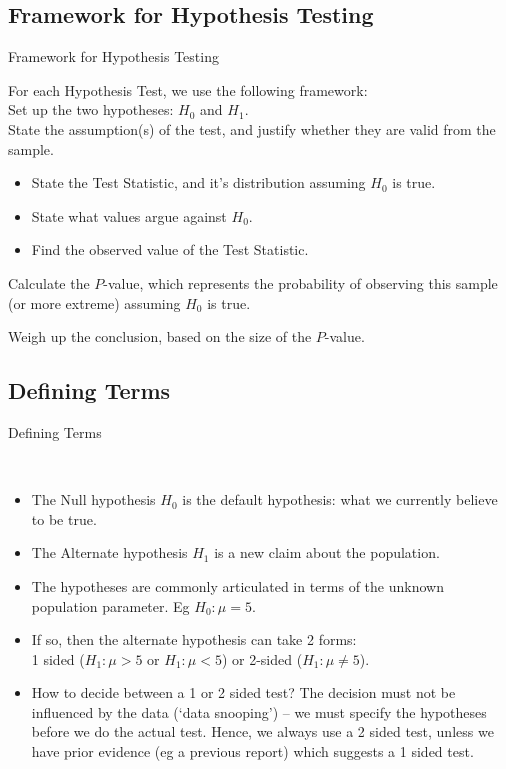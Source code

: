 \documentclass[t,xcolor=pdftex,dvipsnames,table]{beamer}
\begin{document}
\subsection[]{Framework for Hypothesis Testing}
\begin{frame}[fragile]{Framework for Hypothesis Testing}

For each Hypothesis Test,  we use the following framework: \\

\vspace{.5cm}
 Set up the two hypotheses: $H_{0}$ and $H_{1}$. \\

 State the assumption(s) of the test, and justify whether they are valid from the sample.

\begin{itemize}
\item State the Test Statistic, and it's distribution assuming $H_{0}$ is true. 
\item State what values argue against $H_{0}$.
\item Find the observed value of the Test Statistic.
\end{itemize}

 Calculate the $P$-value, which represents the probability of observing this sample (or more extreme) assuming $H_{0}$ is true.

 Weigh up the conclusion, based on the size of the $P$-value.
\end{frame}

\subsection[]{Defining Terms}
\begin{frame}[fragile]{Defining Terms}

 \\

\begin{itemize}
\item 
The Null hypothesis $H_{0}$ is the default hypothesis: what we currently believe to be true. \\
\item
The Alternate hypothesis $H_{1}$ is a new claim about the population. \\
\item The hypotheses are commonly articulated in terms of the unknown population parameter. Eg $H_{0}: \mu = 5$.
\item If so, then the alternate hypothesis can take 2 forms: \\
1 sided ($H_{1}: \mu > 5$ or
$H_{1}: \mu < 5$) or 2-sided ($H_{1}: \mu \neq 5$).
\item How to decide between a 1 or 2 sided test?
The decision must not be influenced by the data (`data snooping') – we must specify the hypotheses before we do the actual test. Hence, we always use a 2 sided test, unless we have prior evidence (eg a previous report) which suggests a 1 sided test.
\end{itemize}
\end{frame}
\end{document}
